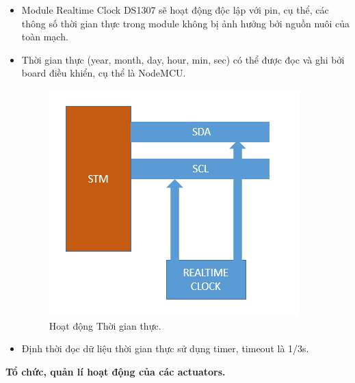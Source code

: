 \documentclass[a4paper,12pt,oneside]{article}
\begin{document}
\begin{itemize}
\item Module Realtime Clock DS1307 sẽ hoạt động độc lập với pin, cụ thể, các thông số thời gian thực trong module không bị ảnh hưởng bởi nguồn nuôi của toàn mạch.
\item Thời gian thực (year, month, day, hour, min, sec) có thể được đọc và ghi bởi board điều khiển, cụ thể là NodeMCU.

\begin{figure}[H]
	\centering
	\includegraphics[scale=0.8]{hinh/Node_Realtime.PNG}
	\caption{Hoạt động Thời gian thực.}
\end{figure}

\item Định thời đọc dữ liệu thời gian thực sử dụng timer, timeout là 1/3s.

\end{itemize}

\noindent \textbf{Tổ chức, quản lí hoạt động của các actuators.}
\end{document}
